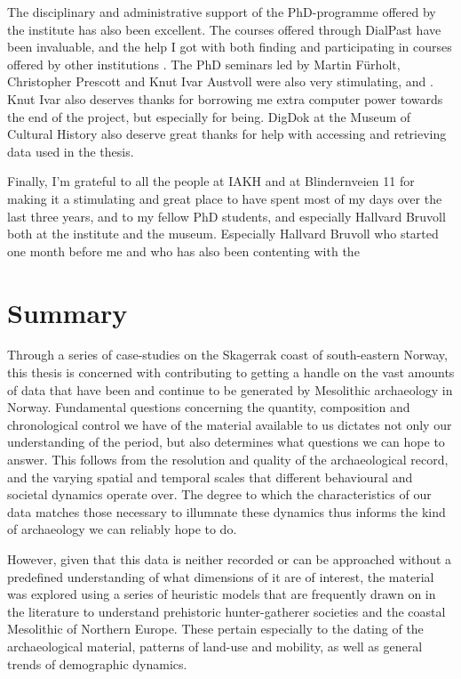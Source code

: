 The disciplinary and administrative support of the PhD-programme offered by the institute has also been excellent. The courses offered through DialPast have been invaluable, and the help I got with both finding and participating in courses offered by other institutions . The PhD seminars led by Martin Fürholt, Christopher Prescott and Knut Ivar Austvoll were also very stimulating, and  . Knut Ivar also deserves thanks for borrowing me extra computer power towards the end of the project, but especially for being.  DigDok at the Museum of Cultural History also deserve great thanks for help with accessing and retrieving data used in the thesis.

Finally, I'm grateful to all the people at IAKH and at Blindernveien 11 for making it a stimulating and great place to have spent most of my days over the last three years, and to my fellow PhD students, and especially Hallvard Bruvoll both at the institute and the museum. Especially Hallvard Bruvoll who started one month before me and who has also been contenting with the 

\section*{Summary}
Through a series of case-studies on the Skagerrak coast of south-eastern Norway, this thesis is concerned with contributing to getting a handle on the vast amounts of data that have been and continue to be generated by Mesolithic archaeology in Norway. Fundamental questions concerning the quantity, composition and chronological control we have of the material available to us dictates not only our understanding of the period, but also determines what questions we can hope to answer. This follows from the resolution and quality of the archaeological record, and the varying spatial and temporal scales that different behavioural and societal dynamics operate over. The degree to which the characteristics of our data matches those necessary to illumnate these dynamics thus informs the kind of archaeology we can reliably hope to do.   

However, given that this data is neither recorded or can be approached without a predefined understanding of what dimensions of it are of interest, the material was explored using a series of heuristic models that are frequently drawn on in the literature to understand prehistoric hunter-gatherer societies and the coastal Mesolithic of Northern Europe. These pertain especially to the dating of the archaeological material, patterns of land-use and mobility, as well as general trends of demographic dynamics. 

